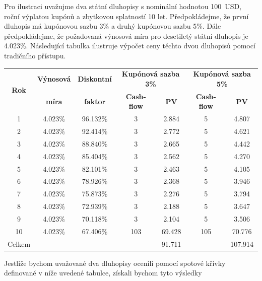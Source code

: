 \documentclass[a4paper]{book}
\begin{document}
Pro ilustraci uvažujme dva státní dluhopisy s nominální hodnotou 100~USD, roční výplatou kupónů a zbytkovou splatností 10 let. Předpokládejme, že první dluhopis má kupónovou sazbu 3\% a druhý kupónovou sazbu 5\%. Dále předpokládejme, že požadovaná výnosová míra pro desetiletý státní dluhopis je 4.023\%. Následující tabulka ilustruje výpočet ceny těchto dvou dluhopisů pomocí tradičního přístupu.
\begin{center}
\begin{tabular}{c c c c c c c}
\multirow{2}{*}{\textbf{Rok}} & \textbf{Výnosová} & \textbf{Diskontní} & \multicolumn{2}{c}{\textbf{Kupónová sazba 3\%}} & \multicolumn{2}{c}{\textbf{Kupónová sazba 5\%}}\\
 & \textbf{míra} & \textbf{faktor} & \textbf{Cash-flow} & \textbf{PV} & \textbf{Cash-flow} & \textbf{PV}\\
\hline
1  & 4.023\% & 96.132\% &   3 &  2.884 &   5 &   4.807\\
2  & 4.023\% & 92.414\% &   3 &  2.772 &   5 &   4.621\\
3  & 4.023\% & 88.840\% &   3 &  2.665 &   5 &   4.442\\
4  & 4.023\% & 85.404\% &   3 &  2.562 &   5 &   4.270\\
5  & 4.023\% & 82.101\% &   3 &  2.463 &   5 &   4.105\\
6  & 4.023\% & 78.926\% &   3 &  2.368 &   5 &   3.946\\
7  & 4.023\% & 75.873\% &   3 &  2.276 &   5 &   3.794\\
8  & 4.023\% & 72.939\% &   3 &  2.188 &   5 &   3.647\\
9  & 4.023\% & 70.118\% &   3 &  2.104 &   5 &   3.506\\
10 & 4.023\% & 67.406\% & 103 & 69.428 & 105 &  70.776\\
Celkem &     &          &     & 91.711 &     & 107.914\\
\end{tabular}
\end{center}
Jestliže bychom uvažované dva dluhopisy ocenili pomocí spotové křivky definované v níže uvedené tabulce, získali bychom tyto výsledky
\end{document}
